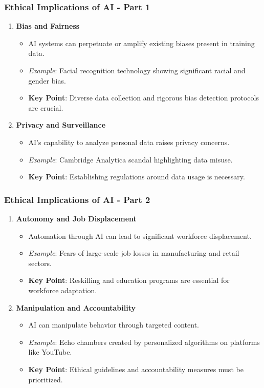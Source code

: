 \documentclass{beamer}
\begin{document}
\begin{frame}[fragile]
    \frametitle{Ethical Implications of AI - Part 1}
    \begin{enumerate}
        \item \textbf{Bias and Fairness}
            \begin{itemize}
                \item AI systems can perpetuate or amplify existing biases present in training data.
                \item \textit{Example}: Facial recognition technology showing significant racial and gender bias.
                \item \textbf{Key Point}: Diverse data collection and rigorous bias detection protocols are crucial.
            \end{itemize}
        \item \textbf{Privacy and Surveillance}
            \begin{itemize}
                \item AI's capability to analyze personal data raises privacy concerns.
                \item \textit{Example}: Cambridge Analytica scandal highlighting data misuse.
                \item \textbf{Key Point}: Establishing regulations around data usage is necessary.
            \end{itemize}
    \end{enumerate}
\end{frame}

\begin{frame}[fragile]
    \frametitle{Ethical Implications of AI - Part 2}
    \begin{enumerate}[start=3]
        \item \textbf{Autonomy and Job Displacement}
            \begin{itemize}
                \item Automation through AI can lead to significant workforce displacement.
                \item \textit{Example}: Fears of large-scale job losses in manufacturing and retail sectors.
                \item \textbf{Key Point}: Reskilling and education programs are essential for workforce adaptation.
            \end{itemize}
        \item \textbf{Manipulation and Accountability}
            \begin{itemize}
                \item AI can manipulate behavior through targeted content.
                \item \textit{Example}: Echo chambers created by personalized algorithms on platforms like YouTube.
                \item \textbf{Key Point}: Ethical guidelines and accountability measures must be prioritized.
            \end{itemize}
    \end{enumerate}
\end{frame}
\end{document}
